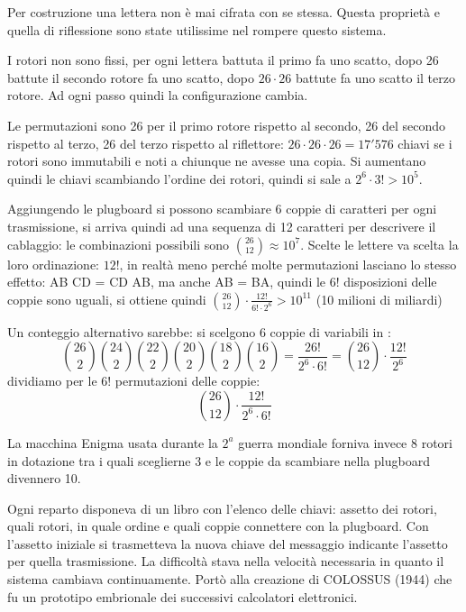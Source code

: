 Per costruzione una lettera non è mai cifrata con se stessa. Questa proprietà e quella di riflessione sono state utilissime nel rompere questo sistema.

I rotori non sono fissi, per ogni lettera battuta il primo fa uno scatto, dopo 26 battute il secondo rotore fa uno scatto, dopo $26 \cdot 26$ battute fa uno scatto il terzo rotore. Ad ogni passo quindi la configurazione cambia.

Le permutazioni sono 26 per il primo rotore rispetto al secondo, 26 del secondo rispetto al terzo, 26 del terzo rispetto al riflettore: $26 \cdot 26 \cdot 26 = 17'576$ chiavi se i rotori sono immutabili e noti a chiunque ne avesse una copia. Si aumentano quindi le chiavi scambiando l'ordine dei rotori, quindi si sale a $2^6 \cdot 3! > 10^5$.

Aggiungendo le plugboard si possono scambiare 6 coppie di caratteri per ogni trasmissione, si arriva quindi ad una sequenza di 12 caratteri per descrivere il cablaggio: le combinazioni possibili sono $\binom{26}{12} \approx 10^7$. Scelte le lettere va scelta la loro ordinazione: $12!$, in realtà meno perché molte permutazioni lasciano lo stesso effetto: AB CD = CD AB, ma anche AB = BA, quindi le $6!$ disposizioni delle coppie sono uguali, si ottiene quindi $\binom{26}{12} \cdot \frac{12!}{6! \cdot 2^6} > 10^11$ (10 milioni di miliardi)

Un conteggio alternativo sarebbe: si scelgono 6 coppie di variabili in :
$$ \binom{26}{2} \binom{24}{2} \binom{22}{2} \binom{20}{2} \binom{18}{2} \binom{16}{2} = \frac{26!}{2^6 \cdot 6!} = \binom{26}{12} \cdot \frac{12!}{2^6} $$
dividiamo per le $6!$ permutazioni delle coppie:
$$ \binom{26}{12} \cdot \frac{12!}{2^6 \cdot 6!} $$

La macchina Enigma usata durante la $2^{a}$ guerra mondiale forniva invece 8 rotori in dotazione tra i quali sceglierne 3 e le coppie da scambiare nella plugboard divennero 10.

Ogni reparto disponeva di un libro con l'elenco delle chiavi: assetto dei rotori, quali rotori, in quale ordine e quali coppie connettere con la plugboard. Con l'assetto iniziale si trasmetteva la nuova chiave del messaggio indicante l'assetto per quella trasmissione. La difficoltà stava nella velocità necessaria in quanto il sistema cambiava continuamente. Portò alla creazione di COLOSSUS (1944) che fu un prototipo embrionale dei successivi calcolatori elettronici.